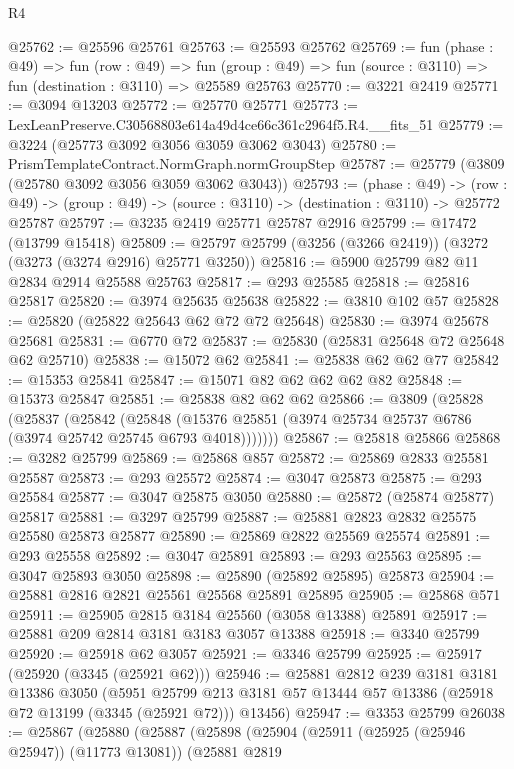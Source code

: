 \begin{lexlean}{R4}
\begin{coremodule}
@25762 := @25596 @25761
@25763 := @25593 @25762
@25769 := fun (phase : @49) =>
  fun (row : @49) =>
  fun (group : @49) => fun (source : @3110) => fun (destination : @3110) => @25589 @25763
@25770 := @3221 @2419
@25771 := @3094 @13203
@25772 := @25770 @25771
@25773 := LexLeanPreserve.C30568803e614a49d4ce66c361c2964f5.R4.__fits_51
@25779 := @3224 (@25773 @3092 @3056 @3059 @3062 @3043)
@25780 := PrismTemplateContract.NormGraph.normGroupStep
@25787 := @25779 (@3809 (@25780 @3092 @3056 @3059 @3062 @3043))
@25793 := (phase : @49) ->
  (row : @49) -> (group : @49) -> (source : @3110) -> (destination : @3110) -> @25772 @25787
@25797 := @3235 @2419 @25771 @25787 @2916
@25799 := @17472 (@13799 @15418)
@25809 := @25797 @25799 (@3256 (@3266 @2419)) (@3272 (@3273 (@3274 @2916) @25771 @3250))
@25816 := @5900 @25799 @82 @11 @2834 @2914 @25588 @25763
@25817 := @293 @25585
@25818 := @25816 @25817
@25820 := @3974 @25635 @25638
@25822 := @3810 @102 @57
@25828 := @25820 (@25822 @25643 @62 @72 @72 @25648)
@25830 := @3974 @25678 @25681
@25831 := @6770 @72
@25837 := @25830 (@25831 @25648 @72 @25648 @62 @25710)
@25838 := @15072 @62
@25841 := @25838 @62 @62 @77
@25842 := @15353 @25841
@25847 := @15071 @82 @62 @62 @62 @82
@25848 := @15373 @25847
@25851 := @25838 @82 @62 @62
@25866 := @3809
    (@25828
      (@25837
        (@25842
          (@25848 (@15376 @25851 (@3974 @25734 @25737 @6786 (@3974 @25742 @25745 @6793 @4018)))))))
@25867 := @25818 @25866
@25868 := @3282 @25799
@25869 := @25868 @857
@25872 := @25869 @2833 @25581 @25587
@25873 := @293 @25572
@25874 := @3047 @25873
@25875 := @293 @25584
@25877 := @3047 @25875 @3050
@25880 := @25872 (@25874 @25877) @25817
@25881 := @3297 @25799
@25887 := @25881 @2823 @2832 @25575 @25580 @25873 @25877
@25890 := @25869 @2822 @25569 @25574
@25891 := @293 @25558
@25892 := @3047 @25891
@25893 := @293 @25563
@25895 := @3047 @25893 @3050
@25898 := @25890 (@25892 @25895) @25873
@25904 := @25881 @2816 @2821 @25561 @25568 @25891 @25895
@25905 := @25868 @571
@25911 := @25905 @2815 @3184 @25560 (@3058 @13388) @25891
@25917 := @25881 @209 @2814 @3181 @3183 @3057 @13388
@25918 := @3340 @25799
@25920 := @25918 @62 @3057
@25921 := @3346 @25799
@25925 := @25917 (@25920 (@3345 (@25921 @62)))
@25946 := @25881
    @2812
    @239
    @3181
    @3181
    @13386
    @3050
    (@5951 @25799 @213 @3181 @57 @13444 @57 @13386 (@25918 @72 @13199 (@3345 (@25921 @72))) @13456)
@25947 := @3353 @25799
@26038 := @25867
    (@25880
      (@25887
        (@25898
          (@25904
            (@25911 (@25925 (@25946 @25947)) (@11773 @13081))
            (@25881
              @2819

\end{coremodule}
\end{lexlean}
